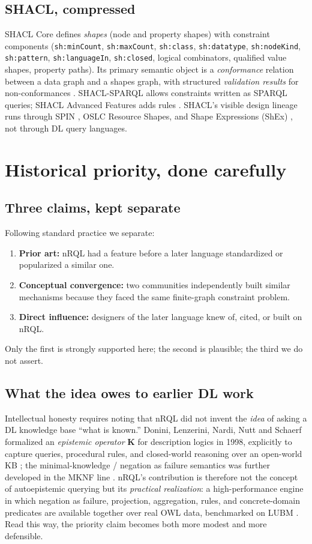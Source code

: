 \documentclass[11pt,letterpaper]{article}
\theoremstyle{definition}
\newcommand{\nrql}{nRQL}
\newcommand{\shacl}{SHACL}
\newcommand{\naf}{negation as failure}
\newcommand{\owl}{OWL}
\begin{document}
\subsection{SHACL, compressed}
\shacl{} Core defines \emph{shapes} (node and property shapes) with constraint components (\texttt{sh:minCount}, \texttt{sh:maxCount}, \texttt{sh:class}, \texttt{sh:datatype}, \texttt{sh:nodeKind}, \texttt{sh:pattern}, \texttt{sh:languageIn}, \texttt{sh:closed}, logical combinators, qualified value shapes, property paths). Its primary semantic object is a \emph{conformance} relation between a data graph and a shapes graph, with structured \emph{validation results} for non-conformances \cite{shacl}. \shacl{}-SPARQL allows constraints written as SPARQL queries; \shacl{} Advanced Features adds rules \cite{shaclaf}. \shacl{}'s visible design lineage runs through SPIN \cite{spin}, OSLC Resource Shapes, and Shape Expressions (ShEx) \cite{shex}, not through DL query languages.

\section{Historical priority, done carefully}\label{sec:priority}

\subsection{Three claims, kept separate}
Following standard practice we separate:
\begin{enumerate}[leftmargin=2em]
  \item \textbf{Prior art:} \nrql{} had a feature before a later language standardized or popularized a similar one.
  \item \textbf{Conceptual convergence:} two communities independently built similar mechanisms because they faced the same finite-graph constraint problem.
  \item \textbf{Direct influence:} designers of the later language knew of, cited, or built on \nrql{}.
\end{enumerate}
Only the first is strongly supported here; the second is plausible; the third we do not assert.

\subsection{What the idea owes to earlier DL work}
Intellectual honesty requires noting that \nrql{} did not invent the \emph{idea} of asking a DL knowledge base ``what is known.'' Donini, Lenzerini, Nardi, Nutt and Schaerf formalized an \emph{epistemic operator} $\mathbf{K}$ for description logics in 1998, explicitly to capture queries, procedural rules, and closed-world reasoning over an open-world KB \cite{epistemic}; the minimal-knowledge / \naf{} semantics was further developed in the MKNF line \cite{mknf}. \nrql{}'s contribution is therefore not the concept of autoepistemic querying but its \emph{practical realization}: a high-performance engine in which \naf{}, projection, aggregation, rules, and concrete-domain predicates are available together over real \owl{} data, benchmarked on LUBM \cite{adl04,nrql05}. Read this way, the priority claim becomes both more modest and more defensible.
\end{document}
